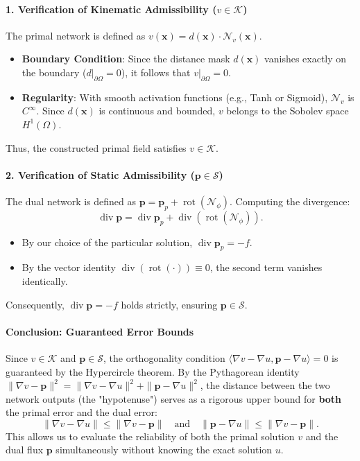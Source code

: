 \documentclass[12pt, a4paper]{article}
\DeclareMathOperator{\rot}{rot}
\DeclareMathOperator{\divg}{div}
\begin{document}
\paragraph{1. Verification of Kinematic Admissibility ($v \in \mathcal{K}$)}
The primal network is defined as $v(\mathbf{x}) = d(\mathbf{x}) \cdot \mathcal{N}_v(\mathbf{x})$.
\begin{itemize}
    \item \textbf{Boundary Condition}: Since the distance mask $d(\mathbf{x})$ vanishes exactly on the boundary ($d|_{\partial \Omega} = 0$), it follows that $v|_{\partial \Omega} = 0$.
    \item \textbf{Regularity}: With smooth activation functions (e.g., Tanh or Sigmoid), $\mathcal{N}_v$ is $C^\infty$. Since $d(\mathbf{x})$ is continuous and bounded, $v$ belongs to the Sobolev space $H^1(\Omega)$.
\end{itemize}
Thus, the constructed primal field satisfies $v \in \mathcal{K}$.

\paragraph{2. Verification of Static Admissibility ($\mathbf{p} \in \mathcal{S}$)}
The dual network is defined as $\mathbf{p} = \mathbf{p}_p + \rot(\mathcal{N}_\phi)$. Computing the divergence:
\begin{equation}
    \divg \mathbf{p} = \divg \mathbf{p}_p + \divg(\rot(\mathcal{N}_\phi)).
\end{equation}
\begin{itemize}
    \item By our choice of the particular solution, $\divg \mathbf{p}_p = -f$.
    \item By the vector identity $\divg(\rot(\cdot)) \equiv 0$, the second term vanishes identically.
\end{itemize}
Consequently, $\divg \mathbf{p} = -f$ holds strictly, ensuring $\mathbf{p} \in \mathcal{S}$.

\paragraph{Conclusion: Guaranteed Error Bounds}
Since $v \in \mathcal{K}$ and $\mathbf{p} \in \mathcal{S}$, the orthogonality condition $\langle \nabla v - \nabla u, \mathbf{p} - \nabla u \rangle = 0$ is guaranteed by the Hypercircle theorem. By the Pythagorean identity $\| \nabla v - \mathbf{p} \|^2 = \| \nabla v - \nabla u \|^2 + \| \mathbf{p} - \nabla u \|^2$, the distance between the two network outputs (the "hypotenuse") serves as a rigorous upper bound for \textbf{both} the primal error and the dual error:
\begin{equation}
    \| \nabla v - \nabla u \| \le \| \nabla v - \mathbf{p} \| \quad \text{and} \quad \| \mathbf{p} - \nabla u \| \le \| \nabla v - \mathbf{p} \|.
\end{equation}
This allows us to evaluate the reliability of both the primal solution $v$ and the dual flux $\mathbf{p}$ simultaneously without knowing the exact solution $u$.
\end{document}
